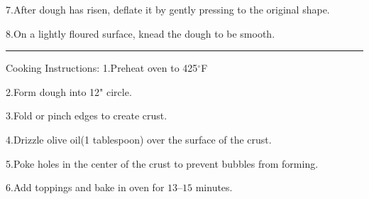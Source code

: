 \documentclass[12pt, letterpaper]{article}
\begin{document}
7.\hspace{0.3cm}After dough has risen, deflate it by gently pressing to the original shape.

8.\hspace{0.3cm}On a lightly floured surface, knead the dough to be smooth.
\break 
\begin{center}\noindent\rule{15cm}{0.4pt}\end{center}
\large{Cooking Instructions:}\bigbreak
\normalsize
1.\hspace{0.3cm}Preheat oven to 425$^\circ$F

2.\hspace{0.3cm}Form dough into 12" circle.

3.\hspace{0.3cm}Fold or pinch edges to create crust.

4.\hspace{0.3cm}Drizzle olive oil(1 tablespoon) over the surface of the crust.

5.\hspace{0.3cm}Poke holes in the center of the crust to prevent bubbles from forming.

6.\hspace{0.3cm}Add toppings and bake in oven for $13–15$ minutes.
\end{document}
